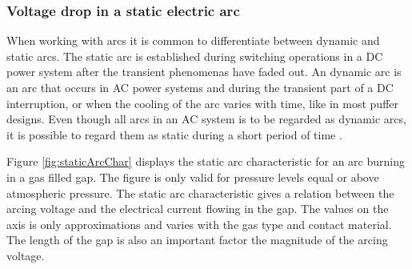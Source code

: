 \documentclass[10pt,a4paper]{article} %
\begin{document}



\subsubsection{Voltage drop in a static electric arc} \label{sec:elarcs}

When working with arcs it is common to differentiate between dynamic and static arcs. The static arc is established during switching operations in a DC power system after the transient phenomenas have faded out. An dynamic arc is an arc that occurs in AC power systems and during the transient part of a DC interruption, or when the cooling of the arc varies with time, like in most puffer designs. Even though all arcs in an AC system is to be regarded as dynamic arcs, it is possible to regard them as static during a short period of time \cite{bib:HVEbreak}.

Figure \ref{fig:staticArcChar} displays the static arc characteristic for an arc burning in a gas filled gap. The figure is only valid for pressure levels equal or above atmospheric pressure. The static arc characteristic gives a relation between the arcing voltage and the electrical current flowing in the gap. The values on the axis is only approximations and varies with the gas type and contact material. The length of the gap is also an important factor the magnitude of the arcing voltage. 
\end{document}
